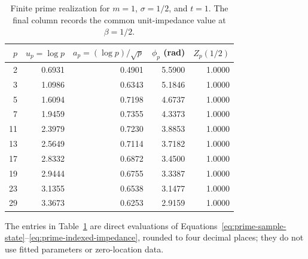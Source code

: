 \documentclass[11pt]{article}
\begin{document}
\begin{table}[H]
\centering
\footnotesize
\caption{Finite prime realization for $m=1$, $\sigma=1/2$, and $t=1$.  The final column
records the common unit-impedance value at $\beta=1/2$.}
\label{tab:prime-amplitude-phase}
\begin{tabular}{rrrrr}
\toprule
$p$ & $u_p=\log p$ & $a_p=(\log p)/\sqrt p$ & $\phi_p$ (rad) & $Z_p(1/2)$\\
\midrule
2  & 0.6931 & 0.4901 & 5.5900 & 1.0000\\
3  & 1.0986 & 0.6343 & 5.1846 & 1.0000\\
5  & 1.6094 & 0.7198 & 4.6737 & 1.0000\\
7  & 1.9459 & 0.7355 & 4.3373 & 1.0000\\
11 & 2.3979 & 0.7230 & 3.8853 & 1.0000\\
13 & 2.5649 & 0.7114 & 3.7182 & 1.0000\\
17 & 2.8332 & 0.6872 & 3.4500 & 1.0000\\
19 & 2.9444 & 0.6755 & 3.3387 & 1.0000\\
23 & 3.1355 & 0.6538 & 3.1477 & 1.0000\\
29 & 3.3673 & 0.6253 & 2.9159 & 1.0000\\
\bottomrule
\end{tabular}
\end{table}

The entries in Table~\ref{tab:prime-amplitude-phase} are direct evaluations of
Equations~\eqref{eq:prime-sample-state}--\eqref{eq:prime-indexed-impedance}, rounded to four
decimal places; they do not use fitted parameters or zero-location data.
\end{document}

